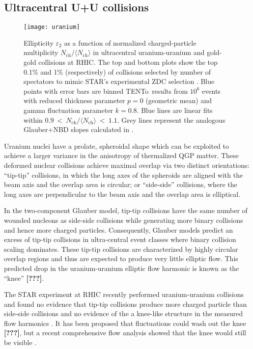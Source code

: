 \documentclass[aps,prl,reprint,amsmath,nofootinbib]{revtex4-1}
\newcommand{\trento}{T\raisebox{-.5ex}{R}ENTo}
\newcommand{\nch}{N_\text{ch}}
\newcommand{\needcite}{\textbf{[???]}}
\begin{document}
\subsection{Ultracentral U+U collisions}

\begin{figure}[b]
  \centering
  \texttt{[image: uranium]}
  \caption{
    \label{fig:uranium}
    Ellipticity $\varepsilon_2$ as a function of normalized charged-particle multiplicity
    $\nch/\langle\nch\rangle$ in ultracentral uranium-uranium and gold-gold collisions at RHIC.  The top and
    bottom plots show the top 0.1\% and 1\% (respectively) of collisions selected by number of spectators to
    mimic STAR's experimental ZDC selection \cite{FortheSTAR:2013bza}.  Blue points with error bars are binned
    \protect\trento\ results from $10^6$ events with reduced thickness parameter $p = 0$ (geometric mean) and
    gamma fluctuation parameter $k = 0.8$.  Blue lines are linear fits within
    $0.9~<~\nch/\langle\nch\rangle~<~1.1$.  Grey lines represent the analogous Glauber+NBD slopes calculated
    in \cite{FortheSTAR:2013bza}.
  }
\end{figure}

Uranium nuclei have a prolate, spheroidal shape which can be exploited to achieve a larger variance in the anisotropy of thermalized QGP matter. 
These deformed nuclear collisions achieve maximal overlap via two distinct orientations: ``tip-tip'' collisions, in which the long axes of the spheroids are 
aligned with the beam axis and the overlap area is circular; or ``side-side'' collisions, where the long axes are perpendicular to the beam axis and the overlap area is elliptical. 

In the two-component Glauber model, tip-tip collisions have the same number of wounded nucleons as side-side collisions while generating more binary collisions and hence more charged particles.
Consequently, Glauber models predict an excess of tip-tip collisions in ultra-central event classes where binary collision scaling dominates. These tip-tip collisions 
are characterized by highly circular overlap regions and thus are expected to produce very little elliptic flow. This predicted drop in the uranium-uranium elliptic flow harmonic is known as the ``knee'' \needcite.

The STAR experiment at RHIC recently performed uranium-uranium collisions and found no evidence that tip-tip collisions produce more charged particle than side-side collisions and no evidence of the 
a knee-like structure in the measured flow harmonics \cite{FortheSTAR:2013bza}.  It has been proposed that fluctuations could wash out the knee \needcite, but a recent
comprehensive flow analysis showed that the knee would still be visible \cite{osu}.
\end{document}
